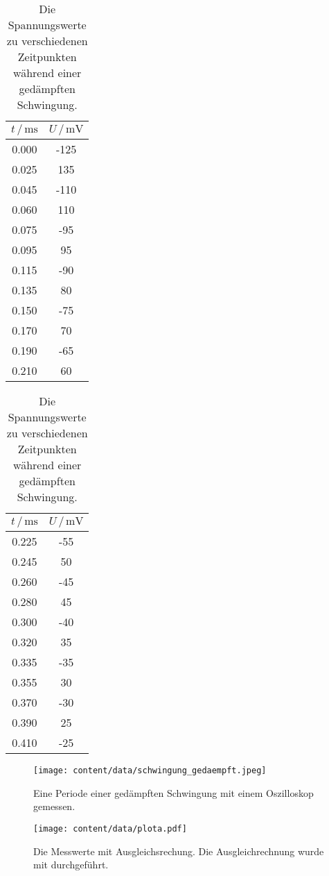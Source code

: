 \begin{table}
\centering
\caption{Die Spannungswerte zu verschiedenen Zeitpunkten während einer gedämpften Schwingung.}
\begin{tabular}[t]{cc}
    \toprule
    $t \, / \, \si{\milli\s}$ & $U \,/\, \si{\milli\V}$ \\
    \midrule
    0.000&-125\\
    0.025&135\\
    0.045&-110\\    
    0.060&110\\
    0.075&-95\\
    0.095&95\\
    0.115&-90\\
    0.135&80\\
    0.150&-75\\
    0.170&70\\
    0.190&-65\\
    0.210&60\\
\end{tabular}
\begin{tabular}[t]{cc}
    \toprule
    $t \, / \, \si{\milli\s}$ & $U \,/\, \si{\milli\V}$ \\
    \midrule
    0.225&-55\\
    0.245&50\\
    0.260&-45\\
    0.280&45\\
    0.300&-40\\
    0.320&35\\
    0.335&-35\\
    0.355&30\\
    0.370&-30\\
    0.390&25\\
    0.410&-25\\
    \bottomrule
\end{tabular}
\label{tab:gedaempft}
\end{table}

\begin{figure}
\centering
\caption{Eine Periode einer gedämpften Schwingung mit einem Oszilloskop gemessen.}
\texttt{[image: content/data/schwingung\_gedaempft.jpeg]}
\label{fig:schwingung}
\end{figure}


\begin{figure}
\centering
\caption{Die Messwerte mit Ausgleichsrechung. Die Ausgleichrechnung wurde mit \cite{matplotlib} durchgeführt.}
\texttt{[image: content/data/plota.pdf]}
\label{fig:ausgleich}
\end{figure}

